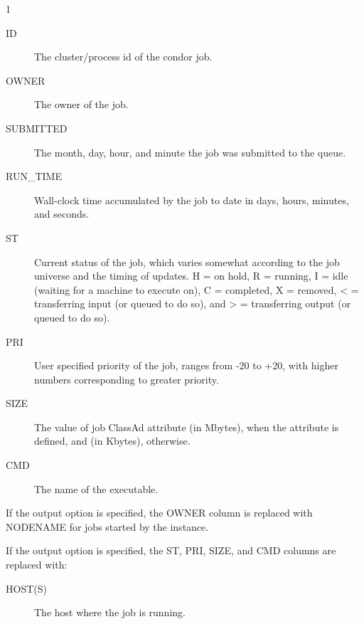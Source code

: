 \begin{ManPage}{\label{man-condor-q}}{1}
\begin{description}
\item[ID] The cluster/process id of the condor job. 
\item[OWNER] The owner of the job. 
\item[SUBMITTED] The month, day, hour, and minute the job was submitted to the 
	queue. 
\item[RUN\_TIME]  Wall-clock time accumulated by the job to date in days, 
	hours, minutes, and seconds.  
\item[ST] Current status of the job, which varies somewhat according
        to the job universe and the timing of updates.
        H = on hold,
        R = running,
	I = idle
        (waiting for a machine to execute on), C = completed, 
        X = removed,
        < = transferring input (or queued to do so), and
        > = transferring output (or queued to do so). 
\item[PRI] User specified priority of the job, ranges from -20 to +20, with 
	higher numbers corresponding to greater priority. 
\item[SIZE] The value of job ClassAd attribute  (in Mbytes),
when the attribute is defined, and  (in Kbytes), otherwise. 
\item[CMD] The name of the executable. 
\end{description}

If the output option  is specified, the OWNER column is replaced
with NODENAME for jobs started by the  instance.

If the output option  is specified, the ST, PRI, SIZE, and CMD
columns are replaced with:

\begin{description}
\item[HOST(S)] The host where the job is running.
\end{description}


\end{ManPage}
